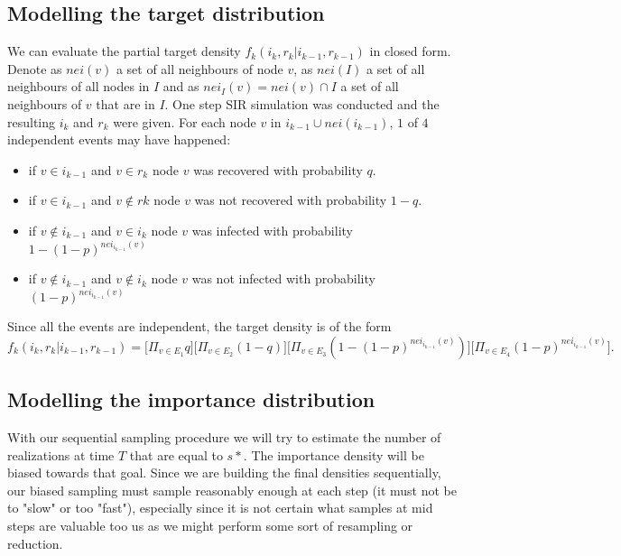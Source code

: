\documentclass[times, utf8, diplomski]{fer}
\begin{document}
\subsection{Modelling the target distribution}
We can evaluate the partial target density $f_k(i_k, r_k | i_{k - 1}, r_{k - 1})$ in closed form. Denote as $nei(v)$ a set of all neighbours of node $v$, as $nei(I)$ a set of all neighbours of all nodes in $I$ and as $nei_I(v) = nei(v) \cap I$ a set of all neighbours of $v$ that are in $I$. One step SIR simulation was conducted and the resulting $i_k$ and $r_k$ were given. For each node $v$ in $i_{k - 1} \cup nei(i_{k - 1})$, $1$ of $4$ independent events may have happened:
\begin{itemize}
\item{if $v \in i_{k - 1}$ and $v \in r_{k}$ node $v$ was recovered with probability $q$.}
\item{if $v \in i_{k - 1}$ and $v \not\in r{k}$ node $v$ was not recovered with probability $1 - q$.}
\item{if $v \not\in i_{k - 1}$ and $v \in i_{k}$ node $v$ was infected with probability $1 - (1 - p) ^ {nei_{i_{k-1}}(v)}$}
\item{if $v \not\in i_{k - 1}$ and $v \not \in i_{k}$ node $v$ was not infected with probability $(1 - p)^{nei_{i_{k-1}}(v)}$}
\end{itemize}

Since all the events are independent, the target density is of the form
\begin{equation*}
f_k(i_k, r_k | i_{k - 1}, r_{k - 1}) = \big[\Pi_{v \in E_1} q\big]\big[ \Pi_{v \in E_2} (1 - q)\big]\big[\Pi_{v \in E_3} (1 - (1 - p) ^ {nei_{i_{k-1}}(v)})\big]\big[\Pi_{v \in E_4} (1 - p)^{nei_{i_{k-1}}(v)} \big].
\end{equation*}

\subsection{Modelling the importance distribution}
With our sequential sampling procedure we will try to estimate the number of realizations at time $T$ that are equal to $s*$. The importance density will be biased towards that goal. Since we are building the final densities sequentially, our biased sampling must sample reasonably enough at each step (it must not be to "slow" or too "fast"), especially since it is not certain what samples at mid steps are valuable too us as we might perform some sort of  resampling or reduction.
\end{document}
